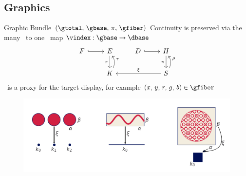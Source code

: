 \documentclass[xcolor={dvipsnames}, handout]{beamer}
\begin{document}
\subsection{Graphics}
\begin{frame}{Graphic Bundle $(\gtotal,\,\gbase,\,\pi ,\,\gfiber)$} %
    Continuity is preserved via the many \gbasepoint\ to one \dbasepoint\ map $\vindex: \gbase\rightarrow\dbase$
    \begin{equation*} 
        \begin{tikzcd}[ampersand replacement=\&]
            F \arrow[r, hook] \& E \arrow[d, "\pi"']              \& D \arrow[r, hook] \& H \arrow[d, "\pi"']                                 \\
                              \& K \arrow[u, "\tau"', bend right] \&                   \& S \arrow[ll, "\xi"'] \arrow[u, "\rho"', bend right]
            \end{tikzcd}
        \end{equation*}
    \pause
    \gfiber\ is a proxy for the target display, for example $(x,\, y,\, r,\, g,\, b) \in \gfiber$
    \pause
    \begin{figure}[H] %
        \includegraphics[width=1\textwidth]{figures/math/retraction_maps.png}
        \label{fig:graphic_retraction_map}
    \end{figure}
\end{frame}
\end{document}
